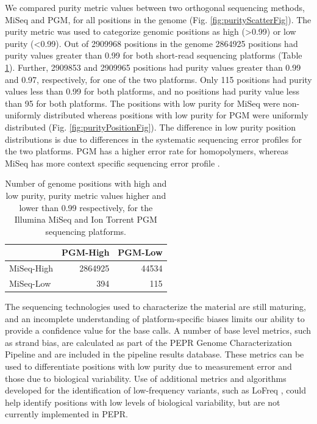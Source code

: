\documentclass[smallextended]{svjour3}\usepackage[]{graphicx}\usepackage[]{color}
\begin{document}
We compared purity metric values between two orthogonal sequencing methods, MiSeq and PGM, for all positions in the genome (Fig. \ref{fig:purityScatterFig}). 
The purity metric was used to categorize genomic positions as high (\textgreater 0.99) or low purity (\textless 0.99).
Out of 2909968 positions in the genome 2864925 positions had purity values greater than 0.99 for both short-read sequencing platforms (Table \ref{Table:purityTable}). 
Further, 2909853 and 2909965 positions had purity values greater than 0.99 and 0.97, respectively, for one of the two platforms. 
Only 115 positions had purity values less than 0.99 for both platforms, and no positions had purity value less than 95 for both platforms. 
The positions with low purity for MiSeq were non-uniformly distributed whereas positions with low purity for PGM were uniformly distributed (Fig. \ref{fig:purityPositionFig}). The difference in low purity position distributions is due to differences in the systematic sequencing error profiles for the two platforms. 
PGM has a higher error rate for homopolymers, whereas MiSeq has more context specific sequencing error profile \cite{Quail2012}. 


\begin{table}[ht]
\centering
\begin{tabular}{lrr}
  \hline
  & PGM-High & PGM-Low \\ 
  \hline
MiSeq-High & 2864925 & 44534 \\ 
  MiSeq-Low & 394 & 115 \\ 
   \hline
\end{tabular}
\caption{Number of genome positions with high and low purity, purity metric values higher and lower than 0.99 respectively, for the Illumina MiSeq and Ion Torrent PGM sequencing platforms.} 
\label{Table:purityTable}
\end{table}



The sequencing technologies used to characterize the material are still maturing, and an incomplete understanding of platform-specific biases limits our ability to provide a confidence value for the base calls. 
A number of base level metrics, such as strand bias, are calculated as part of the PEPR Genome Characterization Pipeline and are included in the pipeline results database. 
These metrics can be used to differentiate positions with low purity due to measurement error and those due to biological variability. 
Use of additional metrics and algorithms developed for the identification of low-frequency variants, such as LoFreq \cite{Wilm2012}, could help identify positions with low levels of biological variability, but are not currently implemented in PEPR. 
\end{document}
